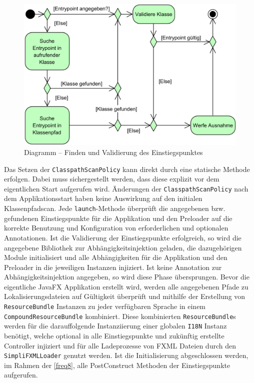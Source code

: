 \begin{figure}[H]
	\centering
	\includegraphics[width=\textwidth-2cm]{Abbildungen/Startprozess.png}
	\caption{Diagramm -- Finden und Validierung des Einstiegspunktes}
	\label{fig:entrypoint_search}
\end{figure}
\noindent Das Setzen der \texttt{ClasspathScanPolicy} kann direkt durch eine statische Methode erfolgen. Dabei muss sichergestellt werden, dass diese explizit vor dem eigentlichen Start aufgerufen wird. Änderungen der \texttt{ClasspathScanPolicy} nach dem Applikationsstart haben keine Auswirkung auf den initialen Klassenpfadscan. Jede \texttt{launch}-Methode überprüft die angegebenen bzw. gefundenen Einstiegspunkte für die Applikation und den Preloader auf die korrekte Benutzung und Konfiguration von erforderlichen und optionalen Annotationen. Ist die Validierung der Einstiegspunkte erfolgreich, so wird die angegebene Bibliothek zur Abhängigkeitsinjektion geladen, die dazugehörigen Module initialisiert und alle Abhängigkeiten für die Applikation und den Preloader in die jeweiligen Instanzen injiziert. Ist keine Annotation zur Abhängigkeitsinjektion angegeben, so wird diese Phase übersprungen. Bevor die eigentliche JavaFX Applikation erstellt wird, werden alle angegebenen Pfade zu Lokalisierungsdateien auf Gültigkeit überprüft und mithilfe der Erstellung von \texttt{ResourceBundle} Instanzen zu jeder verfügbaren Sprache in einem \texttt{CompoundResourceBundle} kombiniert. Diese kombinierten \texttt{ResourceBundle}s werden für die darauffolgende Instanziierung einer globalen \texttt{I18N} Instanz benötigt, welche optional in alle Einstiegspunkte und zukünftig erstellte Controller injiziert und für alle Ladeprozesse von FXML Dateien durch den \texttt{SimpliFXMLLoader} genutzt werden. Ist die Initialisierung abgeschlossen werden, im Rahmen der \autoref{freq8}, alle PostConstruct Methoden der Einstiegspunkte aufgerufen.
